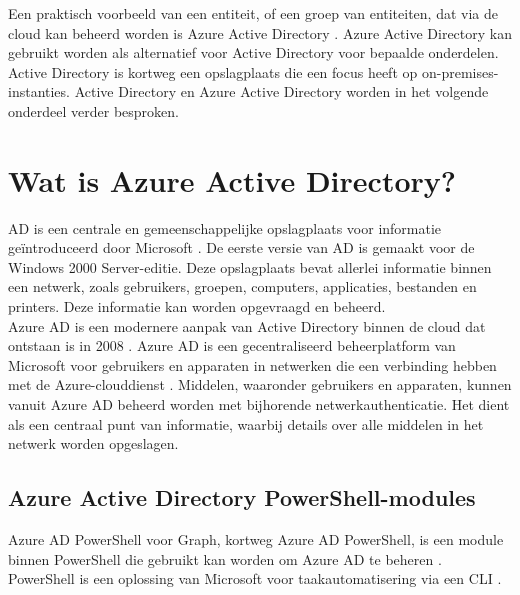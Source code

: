 Een praktisch voorbeeld van een entiteit, of een groep van entiteiten, dat via de cloud kan beheerd worden is Azure Active Directory \autocite{Microsoft2023c}. Azure Active Directory kan gebruikt worden als alternatief voor Active Directory voor bepaalde onderdelen. Active Directory is kortweg een opslagplaats die een focus heeft op on-premises-instanties. Active Directory en Azure Active Directory worden in het volgende onderdeel verder besproken.


\section{Wat is Azure Active Directory?}


\ac{AD} is een centrale en gemeenschappelijke opslagplaats voor informatie geïntroduceerd door Microsoft \autocite{Allen2003}. De eerste versie van \ac{AD} is gemaakt voor de Windows 2000 Server-editie. Deze opslagplaats bevat allerlei informatie binnen een netwerk, zoals gebruikers, groepen, computers, applicaties, bestanden en printers. Deze informatie kan worden opgevraagd en beheerd. \\

Azure \ac{AD} is een modernere aanpak van Active Directory binnen de cloud dat ontstaan is in 2008 \autocite{Chappell2008}. Azure \ac{AD} is een gecentraliseerd beheerplatform van Microsoft voor gebruikers en apparaten in netwerken die een verbinding hebben met de Azure-clouddienst \autocite{Mayank2019}. Middelen, waaronder gebruikers en apparaten, kunnen vanuit Azure \ac{AD} beheerd worden met bijhorende netwerkauthenticatie. Het dient als een centraal punt van informatie, waarbij details over alle middelen in het netwerk worden opgeslagen.

\subsection{Azure Active Directory PowerShell-modules} 


Azure \ac{AD} PowerShell voor Graph, kortweg Azure \ac{AD} PowerShell, is een module binnen PowerShell die gebruikt kan worden om Azure \ac{AD} te beheren \autocite{Microsoft2023}. PowerShell is een oplossing van Microsoft voor taakautomatisering via een \ac{CLI} \autocite{Microsoft2022}. \\

